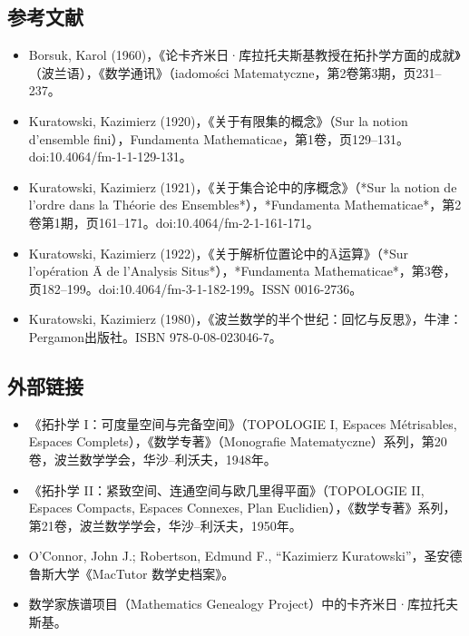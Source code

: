 \subsection{参考文献}
\begin{itemize}
\item Borsuk, Karol (1960)，《论卡齐米日·库拉托夫斯基教授在拓扑学方面的成就》（波兰语），《数学通讯》（iadomości Matematyczne，第2卷第3期，页231–237。
\item Kuratowski, Kazimierz (1920)，《关于有限集的概念》（Sur la notion d'ensemble fini），Fundamenta Mathematicae，第1卷，页129–131。doi:10.4064/fm-1-1-129-131。
\item Kuratowski, Kazimierz (1921)，《关于集合论中的序概念》（*Sur la notion de l'ordre dans la Théorie des Ensembles*），*Fundamenta Mathematicae*，第2卷第1期，页161–171。doi:10.4064/fm-2-1-161-171。
\item Kuratowski, Kazimierz (1922)，《关于解析位置论中的Ā运算》（*Sur l'opération Ā de l'Analysis Situs*），*Fundamenta Mathematicae*，第3卷，页182–199。doi:10.4064/fm-3-1-182-199。ISSN 0016-2736。
\item Kuratowski, Kazimierz (1980)，《波兰数学的半个世纪：回忆与反思》，牛津：Pergamon出版社。ISBN 978-0-08-023046-7。
\end{itemize}
\subsection{外部链接}
\begin{itemize}
\item 《拓扑学 I：可度量空间与完备空间》（TOPOLOGIE I, Espaces Métrisables, Espaces Complets），《数学专著》（Monografie Matematyczne）系列，第20卷，波兰数学学会，华沙–利沃夫，1948年。
\item 《拓扑学 II：紧致空间、连通空间与欧几里得平面》（TOPOLOGIE II, Espaces Compacts, Espaces Connexes, Plan Euclidien），《数学专著》系列，第21卷，波兰数学学会，华沙–利沃夫，1950年。
\item O’Connor, John J.; Robertson, Edmund F., “Kazimierz Kuratowski”，圣安德鲁斯大学《MacTutor 数学史档案》。
\item 数学家族谱项目（Mathematics Genealogy Project）中的卡齐米日·库拉托夫斯基。
\end{itemize}